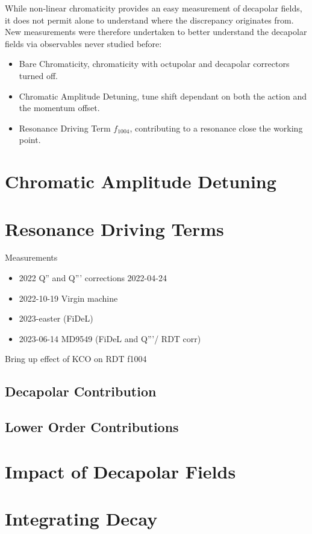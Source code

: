 While non-linear chromaticity provides an easy measurement of decapolar fields, it does not permit
alone to understand where the discrepancy originates from. 
New measurements were therefore undertaken to better understand the decapolar fields via observables
never studied before:
\begin{itemize}
    \tightlist
    \item Bare Chromaticity, chromaticity with octupolar and decapolar correctors turned off.
    \item Chromatic Amplitude Detuning, tune shift dependant on both the action and the momentum 
    offset.
    \item Resonance Driving Term $f_{1004}$, contributing to a resonance close the working point.
\end{itemize}






\section{Chromatic Amplitude Detuning}

\section{Resonance Driving Terms}

Measurements 

\begin{itemize}
    \item 2022 Q'' and Q''' corrections 2022-04-24
    \item 2022-10-19 Virgin machine
    \item 2023-easter (FiDeL)
    \item 2023-06-14 MD9549 (FiDeL and Q'''/ RDT corr)
\end{itemize}

Bring up effect of KCO on RDT f1004

\subsection{Decapolar Contribution}

\subsection{Lower Order Contributions}

\section{Impact of Decapolar Fields}

\section{Integrating Decay}